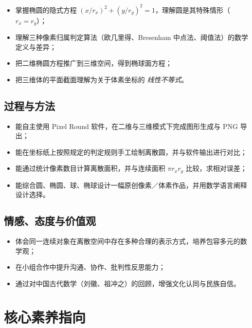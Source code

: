 \documentclass[12pt,a4paper]{scrartcl}
\begin{document}
\begin{itemize}[leftmargin=1.3em,itemsep=0.15em,topsep=0.3em]
  \item 掌握椭圆的隐式方程 $(x/r_x)^2 + (y/r_y)^2 = 1$，理解圆是其特殊情形（$r_x = r_y$）；
  \item 理解三种像素归属判定算法（欧几里得、Bresenham 中点法、阈值法）的数学定义与差异；
  \item 把二维椭圆方程推广到三维空间，得到椭球面方程；
  \item 把三维体的平面截面理解为关于体素坐标的 \emph{线性不等式}。
\end{itemize}

\subsection{过程与方法}

\begin{itemize}[leftmargin=1.3em,itemsep=0.15em,topsep=0.3em]
  \item 能自主使用 Pixel Round 软件，在二维与三维模式下完成图形生成与 PNG 导出；
  \item 能在坐标纸上按照规定的判定规则手工绘制离散圆，并与软件输出进行对比；
  \item 能通过统计像素数目计算离散面积，并与连续面积 $\pi r_x r_y$ 比较，求相对误差；
  \item 能综合圆、椭圆、球、椭球设计一幅原创像素／体素作品，并用数学语言阐释设计选择。
\end{itemize}

\subsection{情感、态度与价值观}

\begin{itemize}[leftmargin=1.3em,itemsep=0.15em,topsep=0.3em]
  \item 体会同一连续对象在离散空间中存在多种合理的表示方式，培养包容多元的数学观；
  \item 在小组合作中提升沟通、协作、批判性反思能力；
  \item 通过对中国古代数学（刘徽、祖冲之）的回顾，增强文化认同与民族自信。
\end{itemize}

\section{核心素养指向}
\end{document}
